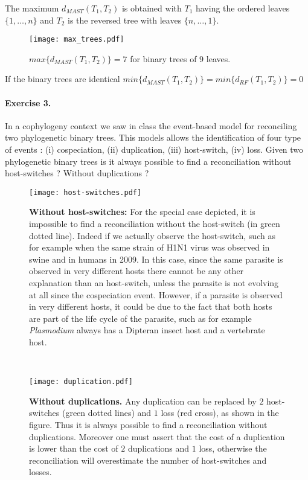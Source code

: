 \documentclass{article}
\begin{document}
The maximum $d_{MAST} (T_1, T_2)$ is obtained with $T_1$ having the ordered leaves $\{1, \ldots, n \}$ and $T_2$ is the  reversed tree with leaves $\{n, \ldots, 1\}$.
\begin{figure}[H]
\centering
\texttt{[image: max\_trees.pdf]}
\caption{$max\{ d_{MAST} (T_1, T_2) \} = 7$  for binary trees of $9$ leaves.}
\end{figure}

If the binary trees are identical $min\{ d_{MAST} (T_1, T_2) \} = min \{ d_{RF} (T_1, T_2) \} =0$
\newpage
\paragraph{Exercise 3. }
In a cophylogeny context we saw in class the event-based model
for reconciling two phylogenetic binary trees. This models allows the
identification of four type of events : (i) cospeciation, (ii) duplication, (iii)
host-switch, (iv) loss. Given two phylogenetic binary trees is it always possible
to find a reconciliation without host-switches ? Without duplications ?
\
\begin{figure}[h!]
\centering
\texttt{[image: host-switches.pdf]}
\caption{\textbf{Without host-switches:} For the special case depicted, it is impossible to find a reconciliation without the host-switch (in green dotted line). Indeed if we actually observe the host-switch, such as for example when the same strain of H1N1 virus was observed in swine and in humans in 2009. In this case, since the same parasite is observed in very different hosts there cannot be any other explanation than an host-switch, unless the parasite is not evolving at all since the cospeciation event. However, if a parasite is observed in very different hosts, it could be due to the fact that both hosts are part of the life cycle of the parasite, such as for example \textit{Plasmodium} always has a Dipteran insect host and a vertebrate host.}
\end{figure}
	\
\begin{figure}[h!]
\centering
\texttt{[image: duplication.pdf]}
\caption{\textbf{Without duplications.} Any duplication can be replaced by $2$ host-switches (green dotted lines) and $1$ loss (red cross), as shown in the figure. Thus it is always possible to find a reconciliation without duplications. Moreover one must assert that the cost of a duplication is lower than the cost of $2$ duplications and $1$ loss, otherwise the reconciliation will overestimate the number of host-switches and losses. }
\end{figure}
\end{document}
